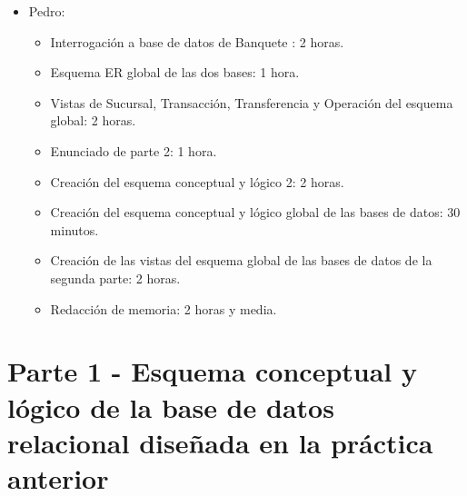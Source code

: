 \documentclass{article}
\begin{document}
\begin{itemize}
\item Pedro: 
\begin{itemize}
\item Interrogación a base de datos de Banquete : 2 horas.
\item Esquema ER global de las dos bases: 1 hora.
\item Vistas de Sucursal, Transacción, Transferencia y Operación del esquema global: 2 horas.
\item Enunciado de parte 2: 1 hora.
\item Creación del esquema conceptual y lógico 2: 2 horas.
\item Creación del esquema conceptual y lógico global de las bases de datos: 30 minutos.
\item Creación de las vistas del esquema global de las bases de datos de la segunda parte: 2 horas.
\item Redacción de memoria: 2 horas y media.
\end{itemize}

\end{itemize}

\newpage
\section{Parte 1 - Esquema conceptual y lógico de la base de datos relacional diseñada en la práctica anterior}
\end{document}
